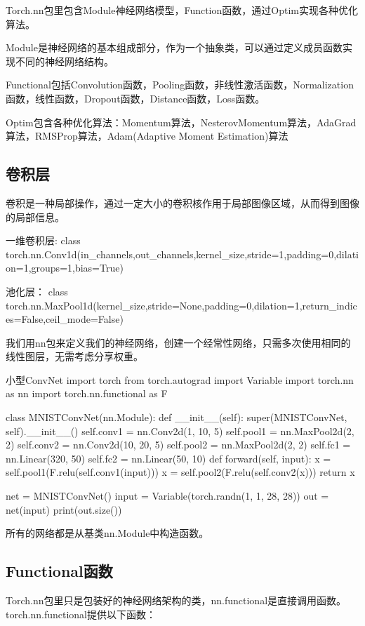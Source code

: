 \documentclass[openbib]{article}
\begin{document}
Torch.nn包里包含Module神经网络模型，Function函数，通过Optim实现各种优化算法。

Module是神经网络的基本组成部分，作为一个抽象类，可以通过定义成员函数实现不同的神经网络结构。

Functional包括Convolution函数，Pooling函数，非线性激活函数，Normalization函数，线性函数，Dropout函数，Distance函数，Loss函数。

Optim包含各种优化算法：Momentum算法，NesterovMomentum算法，AdaGrad算法，RMSProp算法，Adam(Adaptive Moment Estimation)算法

\subsection{卷积层}

卷积是一种局部操作，通过一定大小的卷积核作用于局部图像区域，从而得到图像的局部信息。

一维卷积层:
class torch.nn.Conv1d(in\_channels,out\_channels,kernel\_size,stride=1,padding=0,dilation=1,groups=1,bias=True)

池化层：
class torch.nn.MaxPool1d(kernel\_size,stride=None,padding=0,dilation=1,return\_indices=False,ceil\_mode=False)

我们用nn包来定义我们的神经网络，创建一个经常性网络，只需多次使用相同的线性图层，无需考虑分享权重。

\begin{Python}{小型ConvNet}
	import torch
	from torch.autograd import Variable
	import torch.nn as nn
	import torch.nn.functional as F
	
	class MNISTConvNet(nn.Module):
	def __init__(self):
	super(MNISTConvNet, self).__init__()
	self.conv1 = nn.Conv2d(1, 10, 5)
	self.pool1 = nn.MaxPool2d(2, 2)
	self.conv2 = nn.Conv2d(10, 20, 5)
	self.pool2 = nn.MaxPool2d(2, 2)
	self.fc1 = nn.Linear(320, 50)
	self.fc2 = nn.Linear(50, 10)
	def forward(self, input):
	x = self.pool1(F.relu(self.conv1(input)))
	x = self.pool2(F.relu(self.conv2(x)))
	return x
	
	net = MNISTConvNet()
	input = Variable(torch.randn(1, 1, 28, 28))
	out = net(input)
	print(out.size())	
\end{Python}

所有的网络都是从基类nn.Module中构造函数。

\subsection{Functional函数}

Torch.nn包里只是包装好的神经网络架构的类，nn.functional是直接调用函数。torch.nn.functional提供以下函数：
\end{document}
